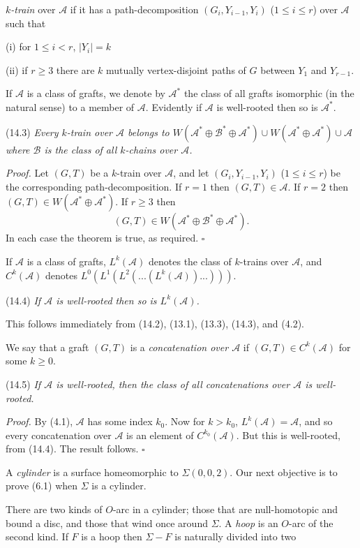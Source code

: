 \noindent \textit{$k$-train} over $\mathcal{A}$ if it has a path-decomposition $(G_i, Y_{i-1}, Y_i)$ ($1 \le i \le r$) over $\mathcal{A}$ such that

\hspace*{12pt}(i) for $1 \le i < r$, $|Y_i| = k$

\hspace*{12pt}(ii) if $r \ge 3$ there are $k$ mutually vertex-disjoint paths of $G$ between $Y_1$ and $Y_{r-1}$.

If $\mathcal{A}$ is a class of grafts, we denote by $\mathcal{A}^*$ the class of all grafts isomorphic (in the natural sense) to a member of $\mathcal{A}$. Evidently if $\mathcal{A}$ is well-rooted then so is $\mathcal{A}^*$.

\stmt
(14.3) \textit{Every $k$-train over $\mathcal{A}$ belongs to $W(\mathcal{A}^* \oplus \mathcal{B}^* \oplus \mathcal{A}^*) \cup W(\mathcal{A}^* \oplus \mathcal{A}^*) \cup \mathcal{A}$ where $\mathcal{B}$ is the class of all $k$-chains over $\mathcal{A}$.}

\textit{Proof.} Let $(G, T)$ be a $k$-train over $\mathcal{A}$, and let $(G_i, Y_{i-1}, Y_i)$ ($1 \le i \le r$) be the corresponding path-decomposition. If $r = 1$ then $(G, T) \in \mathcal{A}$. If $r = 2$ then $(G, T) \in W(\mathcal{A}^* \oplus \mathcal{A}^*)$. If $r \ge 3$ then
\begin{equation*}
(G, T) \in W(\mathcal{A}^* \oplus \mathcal{B}^* \oplus \mathcal{A}^*).
\end{equation*}
In each case the theorem is true, as required. $\square$

If $\mathcal{A}$ is a class of grafts, $L^k(\mathcal{A})$ denotes the class of $k$-trains over $\mathcal{A}$, and $C^k(\mathcal{A})$ denotes $L^0(L^1(L^2(...(L^k(\mathcal{A}))...)))$.

\stmt
(14.4) \textit{If $\mathcal{A}$ is well-rooted then so is $L^k(\mathcal{A})$.}

This follows immediately from (14.2), (13.1), (13.3), (14.3), and (4.2).

We say that a graft $(G, T)$ is a \textit{concatenation over $\mathcal{A}$} if $(G, T) \in C^k(\mathcal{A})$ for some $k \ge 0$.

\stmt
(14.5) \textit{If $\mathcal{A}$ is well-rooted, then the class of all concatenations over $\mathcal{A}$ is well-rooted.}

\textit{Proof.} By (4.1), $\mathcal{A}$ has some index $k_0$. Now for $k > k_0$, $L^k(\mathcal{A}) = \mathcal{A}$, and so every concatenation over $\mathcal{A}$ is an element of $C^{k_0}(\mathcal{A})$. But this is well-rooted, from (14.4). The result follows. $\square$


A \textit{cylinder} is a surface homeomorphic to $\Sigma(0, 0, 2)$. Our next objective is to prove (6.1) when $\Sigma$ is a cylinder.

There are two kinds of $O$-arc in a cylinder; those that are null-homotopic and bound a disc, and those that wind once around $\Sigma$. A \textit{hoop} is an $O$-arc of the second kind. If $F$ is a hoop then $\Sigma - F$ is naturally divided into two
